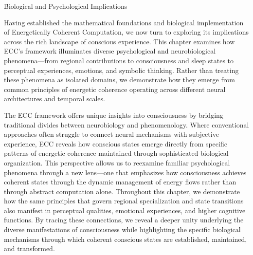 \h{Biological and Psychological Implications}

\begin{refsection}

Having established the mathematical foundations and biological implementation of Energetically Coherent Computation, we now turn to exploring its implications across the rich landscape of conscious experience. This chapter examines how ECC's framework illuminates diverse psychological and neurobiological phenomena—from regional contributions to consciousness and sleep states to perceptual experiences, emotions, and symbolic thinking. Rather than treating these phenomena as isolated domains, we demonstrate how they emerge from common principles of energetic coherence operating across different neural architectures and temporal scales.

The ECC framework offers unique insights into consciousness by bridging traditional divides between neurobiology and phenomenology. Where conventional approaches often struggle to connect neural mechanisms with subjective experience, ECC reveals how conscious states emerge directly from specific patterns of energetic coherence maintained through sophisticated biological organization. This perspective allows us to reexamine familiar psychological phenomena through a new lens—one that emphasizes how consciousness achieves coherent states through the dynamic management of energy flows rather than through abstract computation alone. Throughout this chapter, we demonstrate how the same principles that govern regional specialization and state transitions also manifest in perceptual qualities, emotional experiences, and higher cognitive functions. By tracing these connections, we reveal a deeper unity underlying the diverse manifestations of consciousness while highlighting the specific biological mechanisms through which coherent conscious states are established, maintained, and transformed.














\end{refsection}

